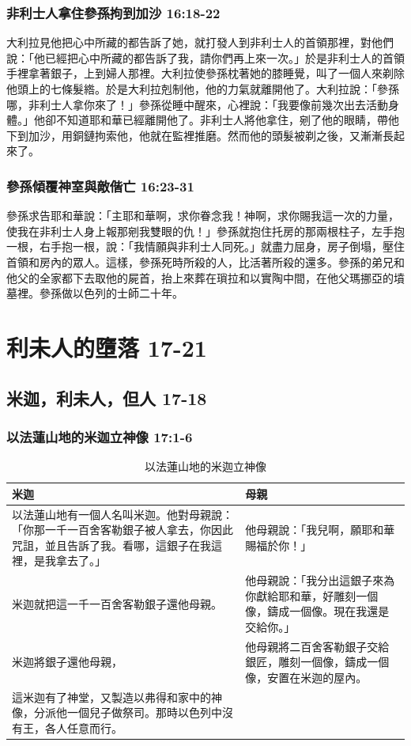\subsubsection{非利士人拿住參孫拘到加沙 16:18-22}
大利拉見他把心中所藏的都告訴了她，就打發人到非利士人的首領那裡，對他們說：「他已經把心中所藏的都告訴了我，請你們再上來一次。」於是非利士人的首領手裡拿著銀子，上到婦人那裡。大利拉使參孫枕著她的膝睡覺，叫了一個人來剃除他頭上的七條髮綹。於是大利拉剋制他，他的力氣就離開他了。大利拉說：「參孫哪，非利士人拿你來了！」參孫從睡中醒來，心裡說：「我要像前幾次出去活動身體。」他卻不知道耶和華已經離開他了。非利士人將他拿住，剜了他的眼睛，帶他下到加沙，用銅鏈拘索他，他就在監裡推磨。然而他的頭髮被剃之後，又漸漸長起來了。

\subsubsection{參孫傾覆神室與敵偕亡 16:23-31}
參孫求告耶和華說：「主耶和華啊，求你眷念我！神啊，求你賜我這一次的力量，使我在非利士人身上報那剜我雙眼的仇！」參孫就抱住托房的那兩根柱子，左手抱一根，右手抱一根，說：「我情願與非利士人同死。」就盡力屈身，房子倒塌，壓住首領和房內的眾人。這樣，參孫死時所殺的人，比活著所殺的還多。參孫的弟兄和他父的全家都下去取他的屍首，抬上來葬在瑣拉和以實陶中間，在他父瑪挪亞的墳墓裡。參孫做以色列的士師二十年。


\section{利未人的墮落 17-21}
\subsection{米迦，利未人，但人 17-18}
\subsubsection{以法蓮山地的米迦立神像 17:1-6}
\begin{table}[H]
\centering
\begin{tabular}{p{9cm}|p{8.1cm}}\hline
米迦&母親\\\hline
以法蓮山地有一個人名叫米迦。他對母親說：「你那一千一百舍客勒銀子被人拿去，你因此咒詛，並且告訴了我。看哪，這銀子在我這裡，是我拿去了。」&他母親說：「我兒啊，願耶和華賜福於你！」 \\\hline
米迦就把這一千一百舍客勒銀子還他母親。&他母親說：「我分出這銀子來為你獻給耶和華，好雕刻一個像，鑄成一個像。現在我還是交給你。」\\\hline
米迦將銀子還他母親，&他母親將二百舍客勒銀子交給銀匠，雕刻一個像，鑄成一個像，安置在米迦的屋內。 \\\hline
這米迦有了神堂，又製造以弗得和家中的神像，分派他一個兒子做祭司。那時以色列中沒有王，各人任意而行。
&\\\hline
\end{tabular}
\caption{以法蓮山地的米迦立神像}
\end{table}  

